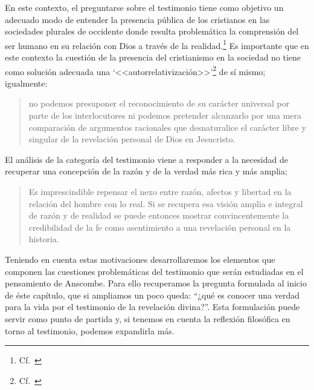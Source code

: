 En este contexto, el preguntarse sobre el testimonio tiene como objetivo un
adecuado modo de entender la presencia pública de los cristianos en las
sociedades plurales de occidente donde resulta problemática la comprensión del
ser humano en su relación con Dios a través de la
realidad.\footnote{Cf.~\cite[75]{prades2015testimonio}} Es importante que en
este contexto la cuestión de la presencia del cristianismo en la sociedad no
tiene como solución adecuada una
\enquote*{<<autorrelativización>>}\footnote{Cf.~\cite[75;\,40--44]{prades2015testimonio}}
de sí mismo; igualmente:
\blockquote[{\cite[75; Cf.~33--40]{prades2015testimonio}}]{no podemos presuponer
  el reconocimiento de su carácter universal por parte de los interlocutores ni
  podemos pretender alcanzarlo por una mera comparación de argumentos racionales
  que desnaturalice el carácter libre y singular de la revelación personal de
  Dios en Jesucristo.}
El análisis de la categoría del testimonio viene a responder a la necesidad de
recuperar una concepción de la razón y de la verdad más rica y más amplia;
\blockquote[{\cite[76]{prades2015testimonio}}]{Es imprescindible repensar el
  nexo entre razón, afectos y libertad en la relación del hombre con lo real. Si
  se recupera esa visión amplia e integral de razón y de realidad se puede
  entonces mostrar convincentemente la credibilidad de la fe como asentimiento a
  una revelación personal en la historia.}

Teniendo en cuenta estas motivaciones desarrollaremos los elementos que componen
las cuestiones problemáticas del testimonio que serán estudiadas en el
pensamiento de Anscombe. Para ello recuperamos la pregunta formulada al inicio
de éste capítulo, que si ampliamos un poco queda: \enquote{¿qué es conocer una
  verdad para la vida por el testimonio de la revelación divina?}. Esta
formulación puede servir como punto de partida y, si tenemos en cuenta la
reflexión filosófica en torno al testimonio, podemos expandirla más.

